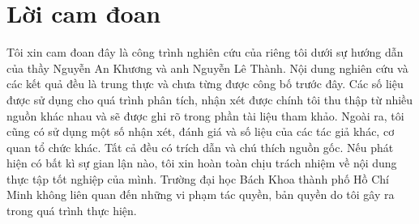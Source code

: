 \section{Lời cam đoan}
Tôi xin cam đoan đây là công trình nghiên cứu của riêng tôi dưới sự hướng
dẫn của thầy Nguyễn An Khương và anh Nguyễn Lê Thành. Nội dung nghiên cứu và các kết quả đều là trung thực và chưa từng được công
bố trước đây. Các số liệu được sử dụng cho quá trình phân tích, nhận xét được chính tôi thu thập từ nhiều nguồn khác nhau và sẽ được ghi rõ trong phần tài liệu tham khảo.
Ngoài ra, tôi cũng có sử dụng một số nhận xét, đánh giá và số liệu của các tác giả
khác, cơ quan tổ chức khác. Tất cả đều có trích dẫn và chú thích nguồn gốc.
Nếu phát hiện có bất kì sự gian lận nào, tôi xin hoàn toàn chịu trách nhiệm về
nội dung thực tập tốt nghiệp của mình. Trường đại học Bách Khoa thành phố Hồ Chí Minh không liên quan đến những vi phạm tác quyền, bản quyền do tôi gây ra trong quá trình thực hiện.